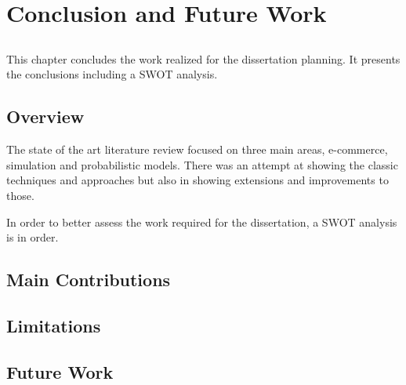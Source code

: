 \chapter{Conclusion and Future Work} \label{chap:conclusion}

\section*{}

This chapter concludes the work realized for the dissertation planning. It 
presents the conclusions including a SWOT analysis.

\section{Overview}

The state of the art literature review focused on three main areas, e-commerce, 
simulation and probabilistic models. There was an attempt at showing the 
classic techniques and approaches but also in showing extensions and 
improvements to those.

In order to better assess the work required for the dissertation, a SWOT 
analysis is in order.

% 
% 
% 
% 


\section{Main Contributions}

\section{Limitations}

\section{Future Work}
